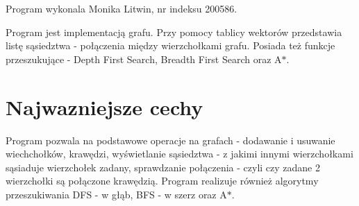 \-Program wykonala \-Monika \-Litwin, nr indeksu 200586.

\-Program jest implementacją grafu. \-Przy pomocy tablicy wektorów przedstawia listę sąsiedztwa -\/ połączenia między wierzchołkami grafu. \-Posiada też funkcje przeszukujące -\/ \-Depth \-First \-Search, \-Breadth \-First \-Search oraz \-A$\ast$.\section{\-Najwazniejsze cechy}\label{index_etykieta-Wazne-cechy}
\-Program pozwala na podstawowe operacje na grafach -\/ dodawanie i usuwanie wiechchołków, krawędzi, wyświetlanie sąsiedztwa -\/ z jakimi innymi wierzchołkami sąsiaduje wierzchołek zadany, sprawdzanie połączenia -\/ czyli czy zadane 2 wierzchołki są połączone krawędzią. \-Program realizuje również algorytmy przeszukiwania \-D\-F\-S -\/ w głąb, \-B\-F\-S -\/ w szerz oraz \-A$\ast$. 